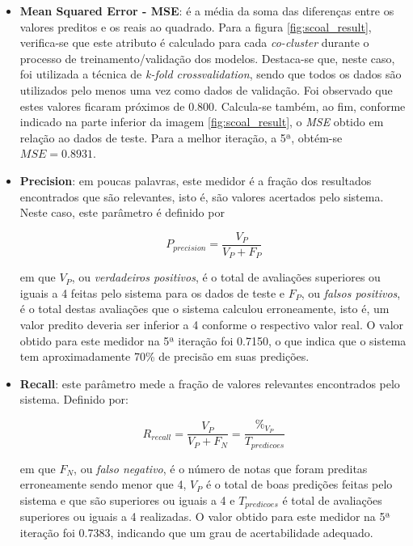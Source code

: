 \begin{itemize}
  \item \textbf{Mean Squared Error - MSE}: é a média da soma das diferenças
  entre os valores preditos e os reais ao quadrado. Para a figura
  \ref{fig:scoal_result},  verifica-se que este atributo é calculado para cada
  \textit{co-cluster} durante o processo de treinamento/validação dos modelos.
  Destaca-se que, neste caso, foi utilizada a técnica de \textit{k-fold
  crossvalidation}, sendo que todos os dados são utilizados pelo menos uma vez
  como dados de validação. Foi observado que estes valores ficaram próximos de
  0.800. Calcula-se também, ao fim, conforme indicado na parte inferior da
  imagem \ref{fig:scoal_result}, o \textit{MSE} obtido em relação ao dados de teste.
  Para a melhor iteração, a 5ª, obtém-se \(MSE = 0.8931\).
 
  \item \textbf{Precision}: em poucas palavras, este medidor é a fração dos
  resultados encontrados que são relevantes, isto é, são valores acertados pelo
  sistema. Neste caso, este parâmetro é definido por
 
  \begin{equation}
  P_{precision} = \frac{V_P}{V_P + F_P}
  \end{equation}
 
 
  em que \(V_P\), ou \textit{verdadeiros positivos}, é o total de avaliações
  superiores ou iguais a 4 feitas pelo sistema para os dados de teste e
  \(F_P\), ou \textit{falsos positivos}, é o total destas avaliações que o
  sistema calculou erroneamente, isto é, um valor predito deveria ser inferior
  a 4 conforme o respectivo  valor real. O valor obtido para este medidor na 5ª
  iteração foi 0.7150, o que indica que o sistema tem aproximadamente 70\% de
  precisão em suas predições.
 
  \item \textbf{Recall}: este parâmetro mede a fração de valores relevantes
  encontrados pelo sistema. Definido por:
 
  \begin{equation}
  R_{recall} = \frac{V_P}{V_P + F_N}  = \frac{\%_{V_P}}{T_{predicoes}}
  \end{equation}
 
  em que \(F_N\), ou \textit{falso negativo}, é o número de notas que foram
  preditas erroneamente sendo menor que 4,  \(V_P\) é o total de boas predições
  feitas pelo sistema e que são superiores ou iguais a 4 e \(T_{predicoes}\) é
  total de avaliações superiores ou iguais a 4 realizadas.  O valor obtido para
  este medidor na 5ª iteração foi 0.7383, indicando que um grau de
  acertabilidade adequado.
 
\end{itemize}
